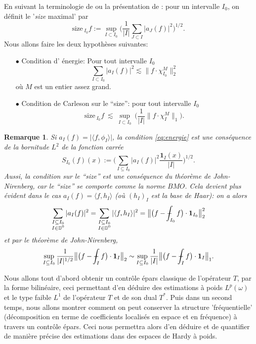 \documentclass[11pt]{amsart}
\newtheorem*{remark}{Remarque}
\newcommand{\size}{{\text{size}\,}}
\newcommand{\one}{\mathbf{1}}
\newcommand{\Dy}{{\mathbb D}}
\def\Xint#1{\mathchoice
   {\XXint\displaystyle\textstyle{#1}}%
   {\XXint\textstyle\scriptstyle{#1}}%
   {\XXint\scriptstyle\scriptscriptstyle{#1}}%
   {\XXint\scriptscriptstyle\scriptscriptstyle{#1}}%
   \!\int}
\def\XXint#1#2#3{{\setbox0=\hbox{$#1{#2#3}{\int}$}
     \vcenter{\hbox{$#2#3$}}\kern-.5\wd0}}
\def\aver#1{\Xint-_{#1}}
\begin{document}
En suivant la terminologie de \cite{MTTBiest0} ou la pr\'esentation de \cite{multilinear_harmonic}: pour un intervalle $I_0$, on d\'efinit le '{\it size} maximal' par
$$ \size_{I_0}f := \sup_{I\subset I_0} \Big(\frac{1}{|I|} \sum_{J\subset I} |a_J(f)|^2\Big)^{1/2}.$$
Nous allons faire les deux hypoth\`eses suivantes: 
\begin{itemize}
 \item[$\bullet$] Condition d' \'energie: Pour tout intervalle $I_0$
 \begin{equation} \sum_{I\subset I_0} |a_I(f)|^2 \lesssim  \|f \cdot\chi_{I_0}^M\|_{2}^2 \label{eq:energie} \end{equation}
 o\`u $M$ est un entier assez grand.
 \item[$\bullet$] Condition de Carleson sur le ``size'': pour tout intervalle $I_0$
 \begin{equation}
  \size_{I_0}f \ \lesssim \ \sup_{I\subset I_0} \ \Big(\frac{1}{|I|} \|f \cdot \chi_{I}^M\|_1\Big). \label{pr:size}
 \end{equation}
\end{itemize}

\begin{remark}
Si $a_I(f)=\vert \langle f, \phi_I \rangle\vert$, la condition \eqref{eq:energie} est une cons\'equence de la bornitude $L^2$ de la fonction carr\'ee 
\begin{equation}
\label{def:square-function}
S_{I_0}(f)(x):=\Big(  \sum_{I \subseteq I_0} \vert a_I(f) \vert^2 \frac{\one_I(x)}{\vert I \vert} \Big)^{1/2}.
\end{equation}
Aussi, la condition sur le ``size'' est une cons\'equence du th\'eor\`eme de John-Nirenberg, car le ``size'' se comporte comme la norme $BMO$. Cela 
devient plus \'evident dans le cas $a_I(f)=\langle f, h_I \rangle$ (o\`u $(h_I)_I$ est la base de Haar): on a alors
\[
\sum_{\substack{I \subseteq I_0 \\ I \in \Dy^0}} \vert a_I(f) \vert^2= \sum_{\substack{I \subseteq I_0 \\ I \in \Dy^0}} \vert \langle f, h_I \rangle \vert^2 =\big\| \big( f - \aver{I_0} f \big) \cdot \one_{I_0} \big\|_2^2
\]
et par le th\'eor\`eme de John-Nirenberg,
\[
\sup_{I \subseteq I_0} \frac{1}{\vert I \vert^{1/2}} \big\| \big( f - \aver{I} f \big) \cdot \one_{I} \big\|_2 \sim \sup_{I \subseteq I_0} \frac{1}{\vert I \vert} \big\| \big( f - \aver{I} f \big) \cdot \one_{I} \big\|_1.
\]
\end{remark}

Nous allons tout d'abord obtenir un contr\^ole \'epars classique de l'op\'erateur $T$, par la forme bilin\'eaire, ceci permettant d'en d\'eduire des estimations \`a poids $L^p(\omega)$ et le type faible $L^1$ de l'op\'erateur $T$ et de son dual $T^*$. Puis dans un second temps, nous allons montrer comment on peut conserver la structure 'fr\'equentielle' (d\'ecomposition en terme de coefficients localis\'es en espace et en fr\'equence) \`a travers un contr\^ole \'epars. Ceci nous permettra alors d'en d\'eduire et de quantifier de mani\`ere pr\'ecise des estimations dans des espaces de Hardy \`a poids.
\end{document}
